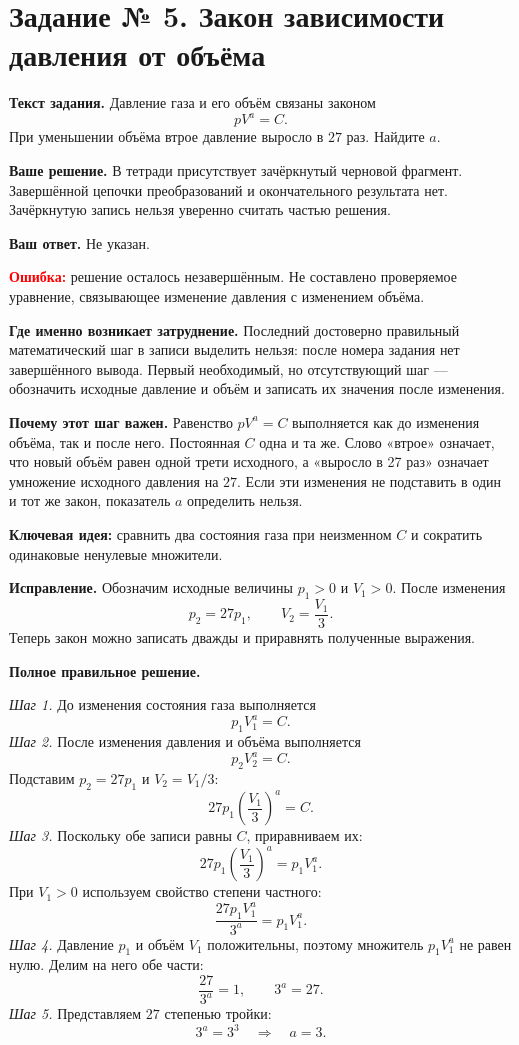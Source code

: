 \documentclass[a4paper,11pt]{article}
\begin{document}
\label{task:5}
\section*{Задание № 5. Закон зависимости давления от объёма}

\textbf{Текст задания.} Давление газа и его объём связаны законом
\[
 pV^a=C.
\]
При уменьшении объёма втрое давление выросло в $27$ раз. Найдите $a$.

\textbf{Ваше решение.} В тетради присутствует зачёркнутый черновой фрагмент. Завершённой цепочки преобразований и окончательного результата нет. Зачёркнутую запись нельзя уверенно считать частью решения.

\textbf{Ваш ответ.} Не указан.

\textcolor{red}{\textbf{Ошибка:}} решение осталось незавершённым. Не составлено проверяемое уравнение, связывающее изменение давления с изменением объёма.

\textbf{Где именно возникает затруднение.} Последний достоверно правильный математический шаг в записи выделить нельзя: после номера задания нет завершённого вывода. Первый необходимый, но отсутствующий шаг --- обозначить исходные давление и объём и записать их значения после изменения.

\textbf{Почему этот шаг важен.} Равенство $pV^a=C$ выполняется как до изменения объёма, так и после него. Постоянная $C$ одна и та же. Слово «втрое» означает, что новый объём равен одной трети исходного, а «выросло в 27 раз» означает умножение исходного давления на $27$. Если эти изменения не подставить в один и тот же закон, показатель $a$ определить нельзя.

\textcolor{blue!60!black}{\textbf{Ключевая идея:}} сравнить два состояния газа при неизменном $C$ и сократить одинаковые ненулевые множители.

\textbf{Исправление.} Обозначим исходные величины $p_1>0$ и $V_1>0$. После изменения
\[
 p_2=27p_1,\qquad V_2=\frac{V_1}{3}.
\]
Теперь закон можно записать дважды и приравнять полученные выражения.

\textbf{Полное правильное решение.}

\emph{Шаг 1.} До изменения состояния газа выполняется
\[
 p_1V_1^a=C.
\]
\emph{Шаг 2.} После изменения давления и объёма выполняется
\[
 p_2V_2^a=C.
\]
Подставим $p_2=27p_1$ и $V_2=V_1/3$:
\[
 27p_1\left(\frac{V_1}{3}\right)^a=C.
\]
\emph{Шаг 3.} Поскольку обе записи равны $C$, приравниваем их:
\[
 27p_1\left(\frac{V_1}{3}\right)^a=p_1V_1^a.
\]
При $V_1>0$ используем свойство степени частного:
\[
 \frac{27p_1V_1^a}{3^a}=p_1V_1^a.
\]
\emph{Шаг 4.} Давление $p_1$ и объём $V_1$ положительны, поэтому множитель $p_1V_1^a$ не равен нулю. Делим на него обе части:
\[
 \frac{27}{3^a}=1,
 \qquad 3^a=27.
\]
\emph{Шаг 5.} Представляем $27$ степенью тройки:
\[
 3^a=3^3\quad\Longrightarrow\quad\boxed{a=3}.
\]
\end{document}
